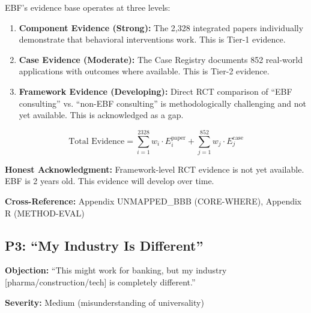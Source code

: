 \begin{axiom}
EBF's evidence base operates at three levels:

\begin{enumerate}
    \item \textbf{Component Evidence (Strong):} The 2,328 integrated papers individually
    demonstrate that behavioral interventions work. This is Tier-1 evidence.

    \item \textbf{Case Evidence (Moderate):} The Case Registry documents 852 real-world
    applications with outcomes where available. This is Tier-2 evidence.

    \item \textbf{Framework Evidence (Developing):} Direct RCT comparison of
    ``EBF consulting'' vs. ``non-EBF consulting'' is methodologically challenging
    and not yet available. This is acknowledged as a gap.
\end{enumerate}

\begin{equation}
\text{Total Evidence} = \sum_{i=1}^{2328} w_i \cdot E_i^{\text{paper}} + \sum_{j=1}^{852} w_j \cdot E_j^{\text{case}}
\end{equation}
\end{axiom}

\textbf{Honest Acknowledgment:} Framework-level RCT evidence is not yet available.
EBF is 2 years old. This evidence will develop over time.

\textbf{Cross-Reference:} Appendix UNMAPPED_BBB (CORE-WHERE), Appendix R (METHOD-EVAL)

\subsection{P3: ``My Industry Is Different''}
\label{sec:da-p3}

\begin{tcolorbox}[colback=gray!5!white, colframe=gray!75!black]
\textbf{Objection:} ``This might work for banking, but my industry
[pharma/construction/tech] is completely different.''

\textbf{Severity:} Medium (misunderstanding of universality)
\end{tcolorbox}

